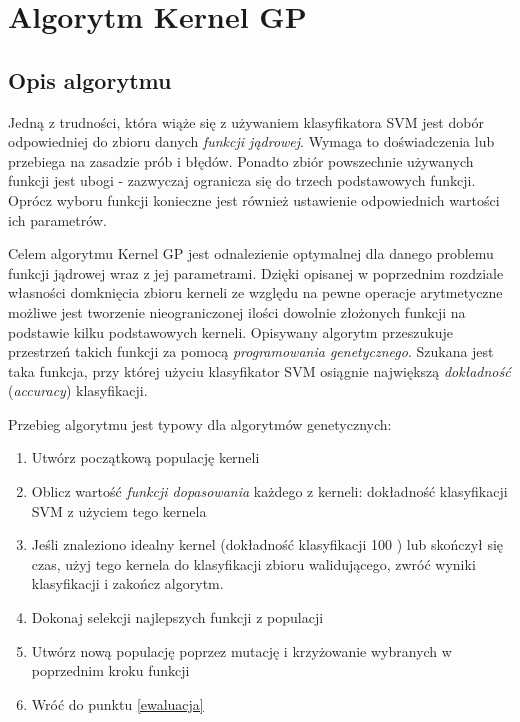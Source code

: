 \chapter{Algorytm Kernel GP}
\section{Opis algorytmu}
Jedną z trudności, która wiąże się z używaniem klasyfikatora SVM jest dobór odpowiedniej do zbioru danych \textit{funkcji jądrowej}. Wymaga to doświadczenia lub przebiega na zasadzie prób i błędów. Ponadto zbiór powszechnie używanych funkcji jest ubogi - zazwyczaj ogranicza się do trzech podstawowych funkcji. Oprócz wyboru funkcji konieczne jest również ustawienie odpowiednich wartości ich parametrów.

Celem algorytmu Kernel GP jest odnalezienie optymalnej dla danego problemu funkcji jądrowej wraz z jej parametrami. Dzięki opisanej w poprzednim rozdziale własności domknięcia zbioru kerneli ze względu na pewne operacje arytmetyczne możliwe jest tworzenie nieograniczonej ilości dowolnie złożonych funkcji na podstawie kilku podstawowych kerneli. Opisywany algorytm przeszukuje przestrzeń takich funkcji za pomocą \textit{programowania genetycznego}. Szukana jest taka funkcja, przy której użyciu klasyfikator SVM osiągnie największą \textit{dokładność} (\textit{accuracy}) klasyfikacji.


Przebieg algorytmu jest typowy dla algorytmów genetycznych:
\begin{enumerate}
\item Utwórz początkową populację kerneli
\item \label{ewaluacja} Oblicz wartość \textit{funkcji dopasowania} każdego z kerneli: dokładność klasyfikacji SVM z użyciem tego kernela
\item Jeśli znaleziono idealny kernel (dokładność klasyfikacji 100 ) lub skończył się czas, użyj tego kernela do klasyfikacji zbioru walidującego, zwróć wyniki klasyfikacji i zakończ algorytm.
\item Dokonaj selekcji najlepszych funkcji z populacji
\item Utwórz nową populację poprzez mutację i krzyżowanie wybranych w poprzednim kroku funkcji
\item Wróć do punktu \ref{ewaluacja}
\end{enumerate}

